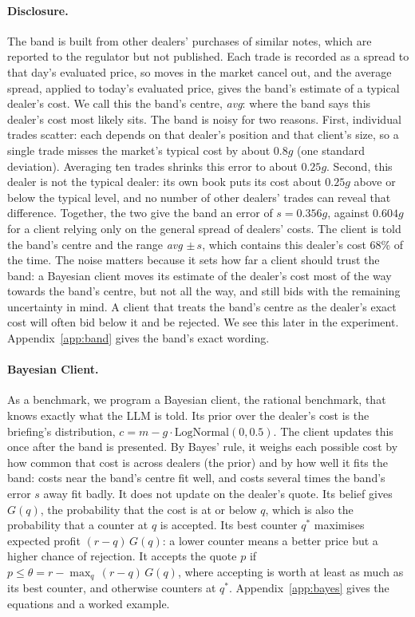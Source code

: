 \documentclass[sigconf]{acmart}
\begin{document}
\paragraph{Disclosure.}
The band is built from other dealers' purchases of similar notes, which are reported to the regulator but not published. Each trade is recorded as a spread to that day's evaluated price, so moves in the market cancel out, and the average spread, applied to today's evaluated price, gives the band's estimate of a typical dealer's cost. We call this the band's centre, \textit{avg}: where the band says this dealer's cost most likely sits. The band is noisy for two reasons. First, individual trades scatter: each depends on that dealer's position and that client's size, so a single trade misses the market's typical cost by about $0.8g$ (one standard deviation). Averaging ten trades shrinks this error to about $0.25g$. Second, this dealer is not the typical dealer: its own book puts its cost about $0.25g$ above or below the typical level, and no number of other dealers' trades can reveal that difference. Together, the two give the band an error of $s = 0.356g$, against $0.604g$ for a client relying only on the general spread of dealers' costs. The client is told the band's centre and the range \textit{avg} $\pm\, s$, which contains this dealer's cost 68\% of the time. The noise matters because it sets how far a client should trust the band: a Bayesian client moves its estimate of the dealer's cost most of the way towards the band's centre, but not all the way, and still bids with the remaining uncertainty in mind. A client that treats the band's centre as the dealer's exact cost will often bid below it and be rejected. We see this later in the experiment. Appendix~\ref{app:band} gives the band's exact wording.

\paragraph{Bayesian Client.}
As a benchmark, we program a Bayesian client, the rational benchmark, that knows exactly what the LLM is told. Its prior over the dealer's cost is the briefing's distribution, $c = m - g \cdot \mathrm{LogNormal}(0, 0.5)$. The client updates this once after the band is presented. By Bayes' rule, it weighs each possible cost by how common that cost is across dealers (the prior) and by how well it fits the band: costs near the band's centre fit well, and costs several times the band's error $s$ away fit badly.
 It does not update on the dealer's quote. Its belief gives $G(q)$, the probability that the cost is at or below $q$, which is also the probability that a counter at $q$ is accepted. Its best counter $q^*$ maximises expected profit $(r - q)\,G(q)$: a lower counter means a better price but a higher chance of rejection. It accepts the quote $p$ if $p \le \theta = r - \max_q\,(r - q)\,G(q)$, where accepting is worth at least as much as its best counter, and otherwise counters at $q^*$. Appendix~\ref{app:bayes} gives the equations and a worked example.
\end{document}
